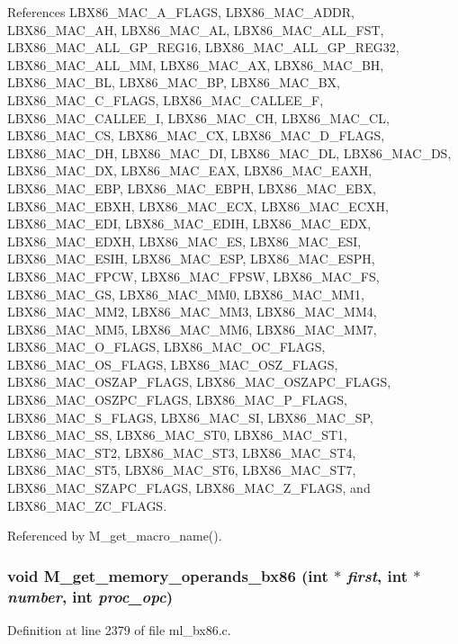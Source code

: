 References LBX86\_\-MAC\_\-A\_\-FLAGS, LBX86\_\-MAC\_\-ADDR, LBX86\_\-MAC\_\-AH, LBX86\_\-MAC\_\-AL, LBX86\_\-MAC\_\-ALL\_\-FST, LBX86\_\-MAC\_\-ALL\_\-GP\_\-REG16, LBX86\_\-MAC\_\-ALL\_\-GP\_\-REG32, LBX86\_\-MAC\_\-ALL\_\-MM, LBX86\_\-MAC\_\-AX, LBX86\_\-MAC\_\-BH, LBX86\_\-MAC\_\-BL, LBX86\_\-MAC\_\-BP, LBX86\_\-MAC\_\-BX, LBX86\_\-MAC\_\-C\_\-FLAGS, LBX86\_\-MAC\_\-CALLEE\_\-F, LBX86\_\-MAC\_\-CALLEE\_\-I, LBX86\_\-MAC\_\-CH, LBX86\_\-MAC\_\-CL, LBX86\_\-MAC\_\-CS, LBX86\_\-MAC\_\-CX, LBX86\_\-MAC\_\-D\_\-FLAGS, LBX86\_\-MAC\_\-DH, LBX86\_\-MAC\_\-DI, LBX86\_\-MAC\_\-DL, LBX86\_\-MAC\_\-DS, LBX86\_\-MAC\_\-DX, LBX86\_\-MAC\_\-EAX, LBX86\_\-MAC\_\-EAXH, LBX86\_\-MAC\_\-EBP, LBX86\_\-MAC\_\-EBPH, LBX86\_\-MAC\_\-EBX, LBX86\_\-MAC\_\-EBXH, LBX86\_\-MAC\_\-ECX, LBX86\_\-MAC\_\-ECXH, LBX86\_\-MAC\_\-EDI, LBX86\_\-MAC\_\-EDIH, LBX86\_\-MAC\_\-EDX, LBX86\_\-MAC\_\-EDXH, LBX86\_\-MAC\_\-ES, LBX86\_\-MAC\_\-ESI, LBX86\_\-MAC\_\-ESIH, LBX86\_\-MAC\_\-ESP, LBX86\_\-MAC\_\-ESPH, LBX86\_\-MAC\_\-FPCW, LBX86\_\-MAC\_\-FPSW, LBX86\_\-MAC\_\-FS, LBX86\_\-MAC\_\-GS, LBX86\_\-MAC\_\-MM0, LBX86\_\-MAC\_\-MM1, LBX86\_\-MAC\_\-MM2, LBX86\_\-MAC\_\-MM3, LBX86\_\-MAC\_\-MM4, LBX86\_\-MAC\_\-MM5, LBX86\_\-MAC\_\-MM6, LBX86\_\-MAC\_\-MM7, LBX86\_\-MAC\_\-O\_\-FLAGS, LBX86\_\-MAC\_\-OC\_\-FLAGS, LBX86\_\-MAC\_\-OS\_\-FLAGS, LBX86\_\-MAC\_\-OSZ\_\-FLAGS, LBX86\_\-MAC\_\-OSZAP\_\-FLAGS, LBX86\_\-MAC\_\-OSZAPC\_\-FLAGS, LBX86\_\-MAC\_\-OSZPC\_\-FLAGS, LBX86\_\-MAC\_\-P\_\-FLAGS, LBX86\_\-MAC\_\-S\_\-FLAGS, LBX86\_\-MAC\_\-SI, LBX86\_\-MAC\_\-SP, LBX86\_\-MAC\_\-SS, LBX86\_\-MAC\_\-ST0, LBX86\_\-MAC\_\-ST1, LBX86\_\-MAC\_\-ST2, LBX86\_\-MAC\_\-ST3, LBX86\_\-MAC\_\-ST4, LBX86\_\-MAC\_\-ST5, LBX86\_\-MAC\_\-ST6, LBX86\_\-MAC\_\-ST7, LBX86\_\-MAC\_\-SZAPC\_\-FLAGS, LBX86\_\-MAC\_\-Z\_\-FLAGS, and LBX86\_\-MAC\_\-ZC\_\-FLAGS.

Referenced by M\_\-get\_\-macro\_\-name().
\subsubsection{\setlength{\rightskip}{0pt plus 5cm}void M\_\-get\_\-memory\_\-operands\_\-bx86 (int $\ast$ {\em first}, int $\ast$ {\em number}, int {\em proc\_\-opc})}\label{ml__bx86_8c_aeb1f7e6392818a6388672cb4207a20b}




Definition at line 2379 of file ml\_\-bx86.c.

